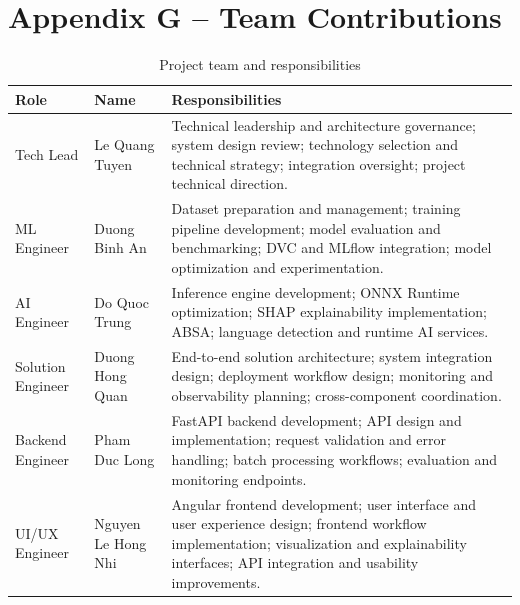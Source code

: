 \documentclass[12pt, a4paper]{article}
\begin{document}
\section{Appendix G -- Team Contributions}
\begin{table}[H]
\centering
\caption{Project team and responsibilities}
\begin{tabularx}{\textwidth}{@{} p{2.8cm} p{3.4cm} X @{}}
\toprule
\textbf{Role} & \textbf{Name} & \textbf{Responsibilities} \\
\midrule
Tech Lead & Le Quang Tuyen & Technical leadership and architecture governance; system design review; technology selection and technical strategy; integration oversight; project technical direction. \\
ML Engineer & Duong Binh An & Dataset preparation and management; training pipeline development; model evaluation and benchmarking; DVC and MLflow integration; model optimization and experimentation. \\
AI Engineer & Do Quoc Trung & Inference engine development; ONNX Runtime optimization; SHAP explainability implementation; ABSA; language detection and runtime AI services. \\
Solution Engineer & Duong Hong Quan & End-to-end solution architecture; system integration design; deployment workflow design; monitoring and observability planning; cross-component coordination. \\
Backend Engineer & Pham Duc Long & FastAPI backend development; API design and implementation; request validation and error handling; batch processing workflows; evaluation and monitoring endpoints. \\
UI/UX Engineer & Nguyen Le Hong Nhi & Angular frontend development; user interface and user experience design; frontend workflow implementation; visualization and explainability interfaces; API integration and usability improvements. \\
\bottomrule
\end{tabularx}
\end{table}
\end{document}
